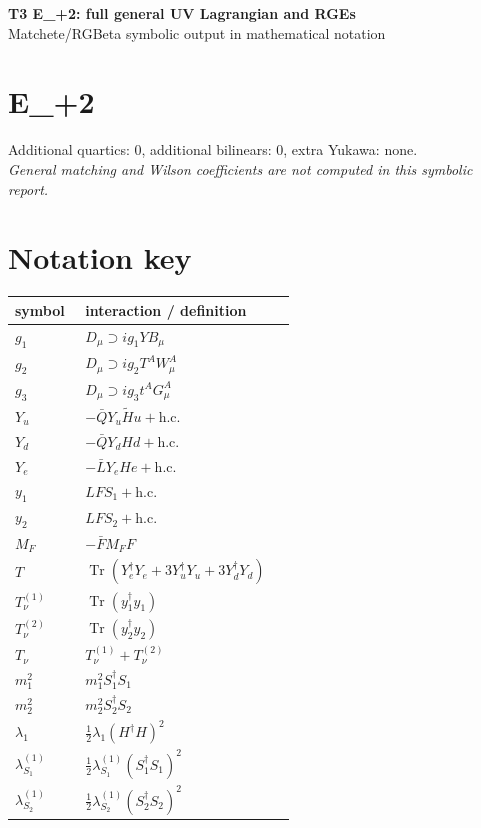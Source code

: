 \documentclass[10pt,a4paper]{article}
\begin{document}
\begin{center}
{\Large\bfseries T3 E\_+2: full general UV Lagrangian and RGEs}\\[4pt]
Matchete/RGBeta symbolic output in mathematical notation
\end{center}
\bigskip
\section*{E\_+2}
Additional quartics: 0, additional bilinears: 0, extra Yukawa: none.\\
\emph{General matching and Wilson coefficients are not computed in this symbolic report.}
\section*{Notation key}
\begin{longtable}{@{}p{0.23\linewidth}p{0.69\linewidth}@{}}
\toprule
symbol & interaction / definition \\
\midrule
$g_1$ & $D_\mu\supset i g_1YB_\mu$ \\
$g_2$ & $D_\mu\supset i g_2T^AW_\mu^A$ \\
$g_3$ & $D_\mu\supset i g_3t^AG_\mu^A$ \\
$Y_u$ & $-\bar QY_u\widetilde Hu+\mathrm{h.c.}$ \\
$Y_d$ & $-\bar QY_dHd+\mathrm{h.c.}$ \\
$Y_e$ & $-\bar LY_eHe+\mathrm{h.c.}$ \\
$y_1$ & $LFS_1+\mathrm{h.c.}$ \\
$y_2$ & $LFS_2+\mathrm{h.c.}$ \\
$M_F$ & $-\bar FM_FF$ \\
$T$ & $\operatorname{Tr}(Y_e^\dagger Y_e+3Y_u^\dagger Y_u+3Y_d^\dagger Y_d)$ \\
$T_\nu^{(1)}$ & $\operatorname{Tr}(y_1^\dagger y_1)$ \\
$T_\nu^{(2)}$ & $\operatorname{Tr}(y_2^\dagger y_2)$ \\
$T_\nu$ & $T_\nu^{(1)}+T_\nu^{(2)}$ \\
$m_1^2$ & $m_1^2S_1^\dagger S_1$ \\
$m_2^2$ & $m_2^2S_2^\dagger S_2$ \\
$\lambda_1$ & $\frac12\lambda_1(H^\dagger H)^2$ \\
$\lambda_{S_1}^{(1)}$ & $\frac12\lambda_{S_1}^{(1)}(S_1^\dagger S_1)^2$ \\
$\lambda_{S_2}^{(1)}$ & $\frac12\lambda_{S_2}^{(1)}(S_2^\dagger S_2)^2$ \\

\end{longtable}
\end{document}

